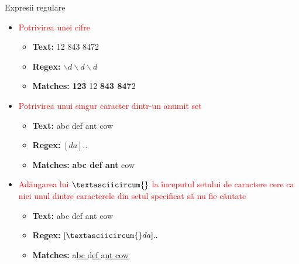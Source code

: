 \documentclass[pdf]{beamer}
\begin{document}
\begin{frame}{Expresii regulare}
\begin{itemize}
\item \textcolor{red}{Potrivirea unei cifre}
\begin{itemize}
\item \textbf{Text:}  12 843 8472
\item \textbf{Regex:} \space $\backslash d \backslash d \backslash d$
\item \textbf{Matches:} \textbf{123} 12 \textbf{843 847}2
\end{itemize}
\item \textcolor{red}{Potrivirea unui singur caracter dintr-un anumit set}
\begin{itemize}
\item \textbf{Text:} \space abc def ant cow
\item \textbf{Regex:} \space $[da]..$
\item \textbf{Matches:} \space \textbf{abc def ant} cow
\end{itemize}
\item \textcolor{red}{Adăugarea lui $\textasciicircum{}$ la începutul setului de caractere cere ca nici unul dintre caracterele din setul specificat să nu fie căutate}
\begin{itemize}
\item \textbf{Text:} \space abc def ant cow
\item \textbf{Regex:} \space $[\textasciicircum{} da]..$
\item \textbf{Matches:} \space a\underline{bc } d\underline{ef } a\underline{nt cow}
\end{itemize}
\end{itemize}
\end{frame}
\end{document}
